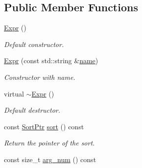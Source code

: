\subsection*{Public Member Functions}
\begin{DoxyCompactItemize}
\item 
\mbox{\label{classilang_1_1_expr_a21346f036f93cf0cc6c42e70f6178c31}} 
\mbox{\hyperlink{classilang_1_1_expr_a21346f036f93cf0cc6c42e70f6178c31}{Expr}} ()
\begin{DoxyCompactList}\small\item\em Default constructor. \end{DoxyCompactList}\item 
\mbox{\label{classilang_1_1_expr_a7bc05b78e7ee22f8fb76f94242dab94f}} 
\mbox{\hyperlink{classilang_1_1_expr_a7bc05b78e7ee22f8fb76f94242dab94f}{Expr}} (const std\+::string \&\mbox{\hyperlink{classilang_1_1_object_acf20b072e69f572910d7d80c93af0b38}{name}})
\begin{DoxyCompactList}\small\item\em Constructor with name. \end{DoxyCompactList}\item 
\mbox{\label{classilang_1_1_expr_acc533197da7a347f17f4853dc6b00d05}} 
virtual \mbox{\hyperlink{classilang_1_1_expr_acc533197da7a347f17f4853dc6b00d05}{$\sim$\+Expr}} ()
\begin{DoxyCompactList}\small\item\em Default destructor. \end{DoxyCompactList}\item 
\mbox{\label{classilang_1_1_expr_a1726b6941cefbd048115cf6e12c9f61b}} 
const \mbox{\hyperlink{namespaceilang_ae01073336878d60a231f4fe96d45ab55}{Sort\+Ptr}} \mbox{\hyperlink{classilang_1_1_expr_a1726b6941cefbd048115cf6e12c9f61b}{sort}} () const
\begin{DoxyCompactList}\small\item\em Return the pointer of the sort. \end{DoxyCompactList}\item 
\mbox{\label{classilang_1_1_expr_addcdb2713bbc7c90622165c126b7dd1f}} 
const size\+\_\+t \mbox{\hyperlink{classilang_1_1_expr_addcdb2713bbc7c90622165c126b7dd1f}{arg\+\_\+num}} () const

\end{DoxyCompactItemize}
